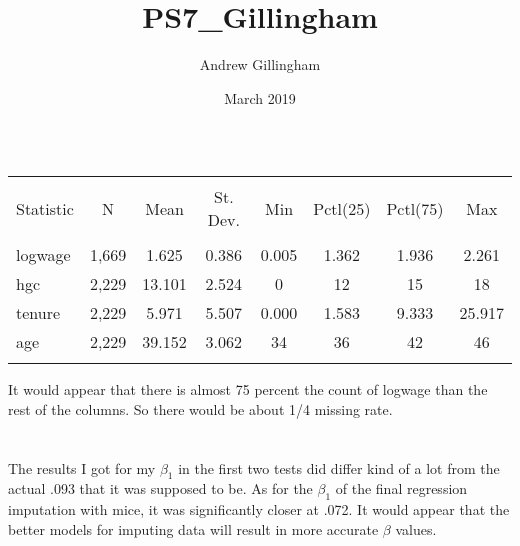 \documentclass{article}
\title{PS7_Gillingham}
\author{Andrew Gillingham }
\date{March 2019}
\begin{document}
\maketitle

\section{}
\begin{table}[!htbp] \centering 
  \caption{} 
  \label{} 
\begin{tabular}{@{\extracolsep{5pt}}lccccccc} 
\\[-1.8ex]\hline 
\hline \\[-1.8ex] 
Statistic & \multicolumn{1}{c}{N} & \multicolumn{1}{c}{Mean} & \multicolumn{1}{c}{St. Dev.} & \multicolumn{1}{c}{Min} & \multicolumn{1}{c}{Pctl(25)} & \multicolumn{1}{c}{Pctl(75)} & \multicolumn{1}{c}{Max} \\ 
\hline \\[-1.8ex] 
logwage & 1,669 & 1.625 & 0.386 & 0.005 & 1.362 & 1.936 & 2.261 \\ 
hgc & 2,229 & 13.101 & 2.524 & 0 & 12 & 15 & 18 \\ 
tenure & 2,229 & 5.971 & 5.507 & 0.000 & 1.583 & 9.333 & 25.917 \\ 
age & 2,229 & 39.152 & 3.062 & 34 & 36 & 42 & 46 \\ 
\hline \\[-1.8ex] 
\end{tabular} 
\end{table} 

It would appear that there is almost 75 percent the count of logwage than the rest of the columns. So there would be about 1/4 missing rate. 

\section{}

The results I got for my $\beta_1$ in the first two tests did differ kind of a lot from the actual .093 that it was supposed to be. As for the $\beta_1$ of the final regression imputation with mice, it was significantly closer at .072. It would appear that the better models for imputing data will result in more accurate $\beta$ values.
\end{document}

